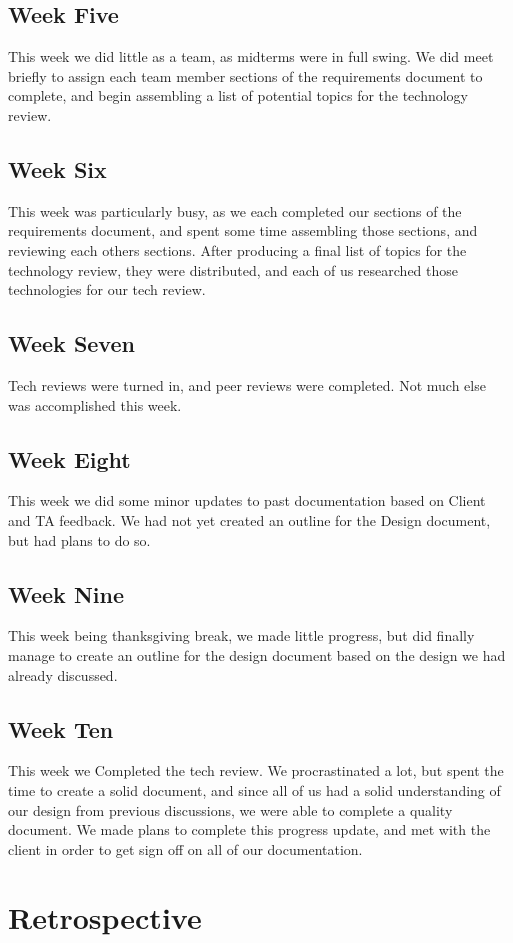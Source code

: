 \documentclass[onecolumn, draftclsnofoot,10pt, compsoc]{IEEEtran}
\begin{document}
\subsection{Week Five}
This week we did little as a team, as midterms were in full swing. We did meet briefly to assign each team member sections of the requirements document to complete, and begin assembling a list of potential topics for the technology review. 
\subsection{Week Six}
This week was particularly busy, as we each completed our sections of the requirements document, and spent some time assembling those sections, and reviewing each others sections. After producing a final list of topics for the technology review, they were distributed, and each of us researched those technologies for our tech review.
\subsection{Week Seven}
Tech reviews were turned in, and peer reviews were completed. Not much else was accomplished this week.
\subsection{Week Eight}
This week we did some minor updates to past documentation based on Client and TA feedback. We had not yet created an outline for the Design document, but had plans to do so.
\subsection{Week Nine}
This week being thanksgiving break, we made little progress, but did finally manage to create an outline for the design document based on the design we had already discussed. 
\subsection{Week Ten}
This week we Completed the tech review. We procrastinated a lot, but spent the time to create a solid document, and since all of us had a solid understanding of our design from previous discussions, we were able to complete a quality document. We made plans to complete this progress update, and met with the client in order to get sign off on all of our documentation. 

\section{Retrospective}
\end{document}
